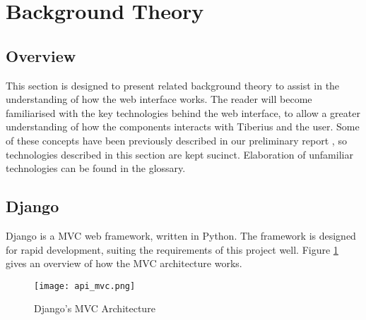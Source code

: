 \section{Background Theory}

\subsection{Overview}
This section is designed to present related background theory to assist in the
understanding of how the web interface works. The reader will become
familiarised with the key technologies behind the web interface, to allow a
greater understanding of how the components interacts with Tiberius and the
user.
\newline
Some of these concepts have been previously described in our preliminary report \cite{tibby-lit-review}, so technologies described in this section are kept sucinct. Elaboration of unfamiliar technologies can be found in the glossary.






\subsection{Django}
Django is a \gls{MVC} web framework, written in Python. The framework is designed for rapid development, suiting the requirements of this project well. Figure \ref{fig:django-mvc} gives an overview of how the MVC architecture works.

\begin{figure}[!htb]
\begin{center}
\texttt{[image: api\_mvc.png]}
\end{center}
\caption{Django's MVC Architecture}
\label{fig:django-mvc}
\end{figure}

